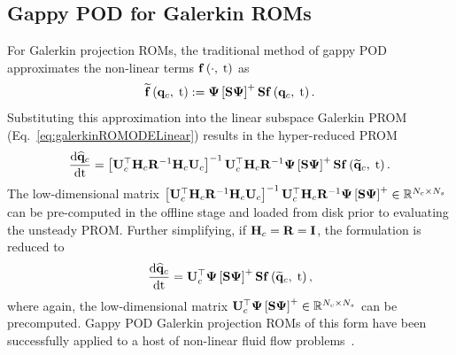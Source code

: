 \subsection{Gappy POD for Galerkin ROMs}
%
For Galerkin projection ROMs, the traditional method of gappy POD approximates the non-linear terms $\mathbf{f} \left(\cdot, \; \text{t}\right)$ as
%
\begin{equation}
	\rhsApproxFunc{\consVec, \; \timeVar} \defEq \deimBasis \left[ \sampMat \deimBasis \right]^+ \sampMat \rhsFunc{\consVec, \; \timeVar}.
\end{equation}
%
Substituting this approximation into the linear subspace Galerkin PROM (Eq.~\ref{eq:galerkinROMODELinear}) results in the hyper-reduced PROM
%
\begin{equation}\label{eq:galerkinROMHR}
    \ode{\consVecCoef}{\timeVar} = \left[\consTrial^\top \consScale \resScaleInv \consScale \consTrial\right]^{-1} \consTrial^\top \consScale \resScaleInv \deimBasis \left[ \sampMat \deimBasis \right]^+ \sampMat \rhsFunc{\consVecRom, \; \timeVar}.
\end{equation}
%
The low-dimensional matrix $\left[\consTrial^\top \consScale \resScaleInv \consScale \consTrial\right]^{-1} \consTrial^\top \consScale \resScaleInv \deimBasis \left[ \sampMat \deimBasis \right]^+ \inRTwo{\numConsModes}{\numSamps}$ can be pre-computed in the offline stage and loaded from disk prior to evaluating the unsteady PROM. Further simplifying, if $\consScale = \resScale = \identMat$, the formulation is reduced to
%
\begin{equation}
    \ode{\consVecCoef}{\timeVar} = \consTrial^\top \deimBasis \left[ \sampMat \deimBasis \right]^+ \sampMat \rhsFunc{\consVecRom, \; \timeVar},
\end{equation}
%
where again, the low-dimensional matrix $\consTrial^\top \deimBasis \left[ \sampMat \deimBasis \right]^+ \inRTwo{\numConsModes}{\numSamps}$ can be precomputed. Gappy POD Galerkin projection ROMs of this form have been successfully applied to a host of non-linear fluid flow problems~\cite{Chaturantabut2011,Stefanescu2013,Wirtz2014,Amsallem2015,Alla2017}.

